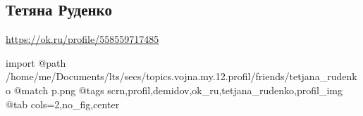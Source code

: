 
 
 
 
 

\subsection{Тетяна Руденко}

\url{https://ok.ru/profile/558559717485}

\ifcmt
  import
  @path /home/me/Documents/lts/secs/topics.vojna.my.12.profil/friends/tetjana_rudenko
  @match p.png
  @tags scrn,profil,demidov,ok_ru,tetjana_rudenko,profil_img
  @tab cols=2,no_fig,center
\fi



